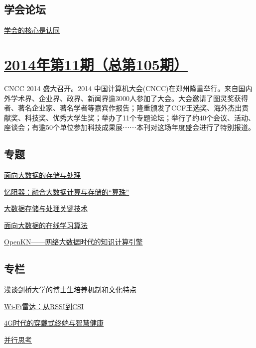 \documentclass[a4paper]{article}
\begin{document}
\subsection{学会论坛}
\href{http://history.ccf.org.cn/resources/1190201776262/2014/12/12/17.pdf}{学会的核心是认同}


\section{\href{http://history.ccf.org.cn/sites/ccf/jsjtbbd.jsp?contentId=2831644844360}{\textbf{2014年第11期（总第105期）}}}
CNCC 2014 盛大召开。2014 中国计算机大会(CNCC)在郑州隆重举行。来自国内外学术界、企业界、政界、新闻界逾3000人参加了大会。大会邀请了图灵奖获得者、著名企业家、著名学者等嘉宾作报告；隆重颁发了CCF王选奖、海外杰出贡献奖、科技奖、优秀大学生奖；举办了11个专题论坛；举行了约40个会议、活动、座谈会；有逾50个单位参加科技成果展⋯⋯本刊对这场年度盛会进行了特别报道。
\subsection{专题}
\href{http://history.ccf.org.cn/resources/1190201776262/2014/11/13/1.pdf}{面向大数据的存储与处理}

\href{http://history.ccf.org.cn/resources/1190201776262/2014/11/13/3.pdf}{忆阻器：融合大数据计算与存储的“算珠”}

\href{http://history.ccf.org.cn/resources/1190201776262/2014/11/13/2.pdf}{大数据存储与处理关键技术}

\href{http://history.ccf.org.cn/resources/1190201776262/2014/11/13/5.pdf}{面向大数据的在线学习算法}

\href{http://history.ccf.org.cn/resources/1190201776262/2014/11/13/4.pdf}{OpenKN——网络大数据时代的知识计算引擎}

\subsection{专栏}
\href{http://history.ccf.org.cn/resources/1190201776262/2014/11/13/7.pdf}{浅谈剑桥大学的博士生培养机制和文化特点}

\href{http://history.ccf.org.cn/resources/1190201776262/2014/11/13/9.pdf}{Wi-Fi雷达：从RSSI到CSI}

\href{http://history.ccf.org.cn/resources/1190201776262/2014/11/13/11.pdf}{4G时代的穿戴式终端与智慧健康}

\href{http://history.ccf.org.cn/resources/1190201776262/2014/11/13/10.pdf}{并行思考}
\end{document}

